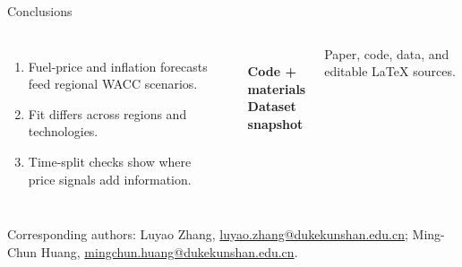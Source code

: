 \documentclass[11pt,aspectratio=169,xcolor={dvipsnames}]{beamer}
\newcommand{\source}[1]{\par\vfill{\fontsize{6.3}{7.5}\selectfont\color{PaperGray}\raggedright #1\par}}
\newcommand{\smalllabel}[1]{{\scriptsize\color{PaperGray}#1}}
\begin{document}
\begin{frame}[t]{Conclusions}
\vspace{0.30cm}
\begin{columns}[T,onlytextwidth]
\small
\begin{enumerate}
\item Fuel-price and inflation forecasts feed regional WACC scenarios.
\item Fit differs across regions and technologies.
\item Time-split checks show where price signals add information.
\end{enumerate}
\vspace{0.1cm}
{\small\textbf{\PresenterName}\\\PaperAffiliation\\
\href{mailto:shilin.ou@dukekunshan.edu.cn}{\PresenterEmail}\par}
\vspace{0.15cm}
\begin{columns}[T,onlytextwidth]
\centering
{}\\[0.25cm]
\scriptsize\textbf{Code + materials}
\centering
{}\\[0.25cm]
\scriptsize\textbf{Dataset snapshot}
\end{columns}
\vspace{0.45cm}
\smalllabel{Paper, code, data, and editable LaTeX sources.}
\end{columns}
\source{Corresponding authors: Luyao Zhang, \href{mailto:luyao.zhang@dukekunshan.edu.cn}{luyao.zhang@dukekunshan.edu.cn}; Ming-Chun Huang, \href{mailto:mingchun.huang@dukekunshan.edu.cn}{mingchun.huang@dukekunshan.edu.cn}.}
\note{\CorrespondenceText\par\FundingText\par\AuthorNoteText\par\PreparationText}
\end{frame}
\end{document}
